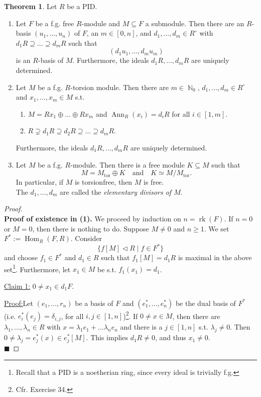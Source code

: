 \documentclass[12pt,a4paper]{report}
\theoremstyle{definition}
\newtheorem{theorem}{Theorem}[chapter] %
\theoremstyle{num.custom-title}
\newenvironment{claim}[1]{\par\noindent\underline{Claim#1:}\space}{} %
\newenvironment{claimproof}[1]{\par\noindent\underline{Proof:}\space#1}{\leavevmode\unskip\penalty9999 \hbox{}\nobreak\hfill\quad\hbox{$\blacksquare$}} %
\DeclareMathOperator{\rk}{rk}
\DeclareMathOperator{\tor}{tor}
\DeclareMathOperator{\Hom}{Hom}
\DeclareMathOperator{\Ann}{Ann}
\DeclareMathOperator{\N}{\mathbb{N}}
\DeclareMathOperator{\sse}{\subseteq}
\begin{document}
\begin{theorem}\label{thm_modules_over_PID}
Let $R$ be a PID.
\begin{enumerate}
\item Let $F$ be a f.g. free $R$-module and $M \sse F$ a submodule. Then there are an $R$-basis $(u_1,...,u_n)$ of $F$, an $m \in [0,n]$, and $d_1,...,d_m \in R^\circ$ with $d_1 R \supseteq \ldots \supseteq d_m R$ such that
\[
(d_1 u_1, \ldots, d_m u_m)
\]
is an $R$-basis of $M$. Furthermore, the ideals $d_1 R,...,d_m R$ are uniquely determined.
\item Let $M$ be a f.g. $R$-torsion module. Then there are $m \in \N_0$, $d_1,...,d_m \in R^\circ$ and $x_1,...,x_m \in M$ s.t.
\begin{enumerate}
\item $M = R x_1 \oplus \ldots \oplus R x_m$ and $\Ann_R(x_i) = d_i R$ for all $i \in [1,m]$.
\item $R \supsetneq d_1 R \supseteq d_2 R \supseteq \ldots \supseteq d_m R$.
\end{enumerate}
Furthermore, the ideals $d_1 R,...,d_m R$ are uniquely determined.
\item Let $M$ be a f.g. $R$-module. Then there is a free module $K \sse M$ such that 
\[
M = M_{\tor} \oplus K \quad \text{and} \quad K \simeq M/M_{\tor}.
\]
In particular, if $M$ is torsionfree, then $M$ is free.\\
The $d_1,...,d_m$ are called the \emph{elementary divisors of $M$}.
\end{enumerate}
\begin{proof}\ \\
\textbf{Proof of existence in (1).} We proceed by induction on $n = \rk(F)$. If $n=0$ or $M=0$, then there is nothing to do. Suppose $M \neq 0$ and $n \geq 1$. We set $F^* := \Hom_R(F,R)$. Consider
\[
\{f[M] \lhd R \mid f \in F^*\}
\]
and choose $f_1 \in F^*$ and $d_1 \in R$ such that $f_1[M] = d_1 R$ is maximal in the above set\footnote{Recall that a PID is a noetherian ring, since every ideal is trivially f.g.}. Furthermore, let $x_1 \in M$ be s.t. $f_1(x_1)=d_1$.
\begin{claim}{ 1}
$0 \neq x_1 \in d_1 F$.
\begin{claimproof}
Let $(e_1,...,r_n)$ be a basis of $F$ and $(e_1^*,...,e_n^*)$ be the dual basis of $F^*$ (i.e. $e_i^*(e_j)=\delta_{i,j}$, for all $i,j \in [1,n]$)\footnote{Cfr. Exercise 34.}. If $0 \neq x \in M$, then there are $\lambda_1,...,\lambda_n \in R$ with $x=\lambda_1 e_1 + \ldots \lambda_n e_n$ and there is a $j \in [1,n]$ s.t. $\lambda_j \neq 0$. Then $0 \neq \lambda_j = e_j^*(x) \in e_j^*[M]$. This implies $d_1 R \neq 0$, and thus $x_1 \neq 0$.\\

\end{claimproof}
\end{claim}
\end{proof}
\end{theorem}
\end{document}
